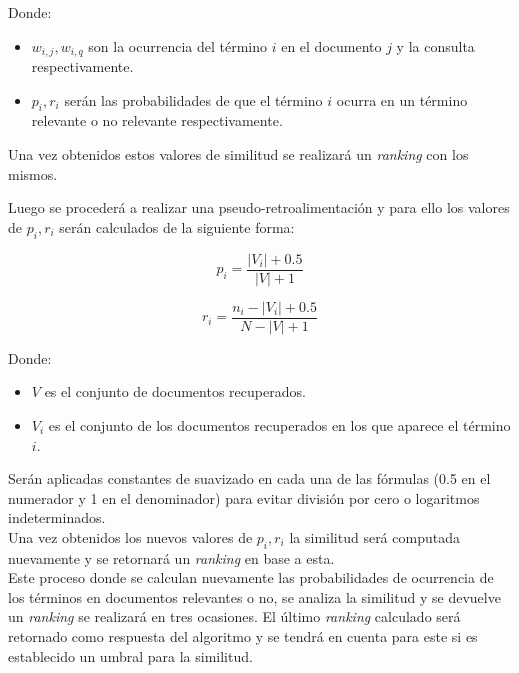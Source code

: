 \documentclass[spanish]{article}
\begin{document}
			Donde:
			\begin{itemize}
				\item $ w_{i,j}, w_{i,q} $ son la ocurrencia del término $ i $ en el documento $ j $ y la consulta respectivamente.

				\item $ p_i, r_i $ serán las probabilidades de que el término $ i $ ocurra en un término relevante o no relevante respectivamente.
			\end{itemize}

			Una vez obtenidos estos valores de similitud se realizará un \emph{ranking} con los mismos. 

			Luego se procederá a realizar una pseudo-retroalimentación y para ello los valores de $ p_i, r_i $ serán calculados de la siguiente forma:

			\begin{equation}
				p_i = \frac{|V_i| + 0.5}{|V| + 1}
			\end{equation}
			
			\begin{equation}
				\displaystyle r_i = \frac{n_i - |V_i| + 0.5}{N - |V| + 1}
			\end{equation}
			
			Donde:

			\begin{itemize}
				\item $ V $ es el conjunto de documentos recuperados.
				\item $ V_i $ es el conjunto de los documentos recuperados en los que aparece el término $ i $.
			\end{itemize}

			Serán aplicadas constantes de suavizado en cada una de las fórmulas (0.5 en el numerador y 1 en el denominador) para evitar división por cero o logaritmos indeterminados.\\
			
			Una vez obtenidos los nuevos valores de $ p_i, r_i $ la similitud será computada nuevamente y se retornará un \emph{ranking} en base a esta.\\

			Este proceso donde se calculan nuevamente las probabilidades de ocurrencia de los términos en documentos relevantes o no, se analiza la similitud y se devuelve un \emph{ranking} se realizará en tres ocasiones. El último \emph{ranking} calculado será retornado como respuesta del algoritmo y se tendrá en cuenta para este si es establecido un umbral para la similitud.
\end{document}
